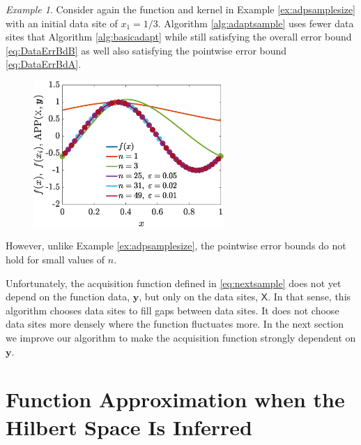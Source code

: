 \documentclass[]{mcom-l}
\theoremstyle{theorem}
\theoremstyle{remark}
\newtheorem{example}{Example}
\newcommand{\mX}{\mathsf{X}}
\newcommand{\by}{{\boldsymbol{y}}}
\begin{document}
\begin{example}
\label{ex:adpdataselect}
Consider again the function and kernel in Example \ref{ex:adpsamplesize} with an initial data site of $x_1=1/3$.
Algorithm \ref{alg:adaptsample} uses fewer data sites that Algorithm \ref{alg:basicadapt} while still satisfying the overall error bound \eqref{eq:DataErrBdB} as well also satisfying the pointwise error bound \eqref{eq:DataErrBdA}.
	
		
	
	
	\begin{figure}[H]
		\centering
		\includegraphics[height = 5.5cm]{ProgramsImages/Alg2_CurrinSineFun_Matern_adapt_th_EmpBayesAx_theta_1.eps}
		\caption{ \label{fig:ex2}}
	\end{figure}
	
\end{example}

However, unlike Example  \ref{ex:adpsamplesize}, the  pointwise error bounds do not hold for small values of $n$.



Unfortunately, the acquisition function defined in \eqref{eq:nextsample} does not yet depend on the function data, $\by$, but only on the data sites, $\mX$.  In that sense, this algorithm chooses data sites to fill gaps between data sites.  It does not choose data sites more densely where the function  fluctuates more.  In the next section we improve our algorithm to make the acquisition function strongly dependent on $\by$.





\section{Function Approximation when the Hilbert Space Is Inferred} \label{sec:adaptF}
\end{document}

